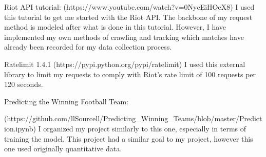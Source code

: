 \documentclass[11pt]{article}
\begin{document}
Riot API tutorial: (https://www.youtube.com/watch?v=0NycEiHOeX8) I used
this tutorial to get me started with the Riot API. The backbone of my
request method is modeled after what is done in this tutorial. However,
I have implemented my own methods of crawling and tracking which matches
have already been recorded for my data collection process.

Ratelimit 1.4.1 (https://pypi.python.org/pypi/ratelimit) I used this
external library to limit my requests to comply with Riot's rate limit
of 100 requests per 120 seconds.

Predicting the Winning Football Team:

(https://github.com/llSourcell/Predicting\_Winning\_Teams/blob/master/Prediction.ipynb)
I organized my project similarly to this one, especially in terms of
training the model. This project had a similar goal to my project,
however this one used originally quantitative data.


    
    
    
    
\end{document}
